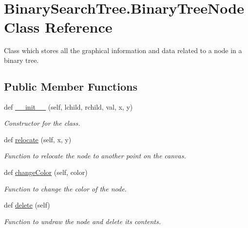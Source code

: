 \hypertarget{class_binary_search_tree_1_1_binary_tree_node}{}\section{Binary\+Search\+Tree.\+Binary\+Tree\+Node Class Reference}
\label{class_binary_search_tree_1_1_binary_tree_node}


Class which stores all the graphical information and data related to a node in a binary tree.  


\subsection*{Public Member Functions}
\begin{DoxyCompactItemize}
\item 
def \hyperlink{class_binary_search_tree_1_1_binary_tree_node_a82eeb27919e933cb0bbab2bb19a4674a}{\+\_\+\+\_\+init\+\_\+\+\_\+} (self, lchild, rchild, val, x, y)
\begin{DoxyCompactList}\small\item\em Constructor for the class. \end{DoxyCompactList}\item 
def \hyperlink{class_binary_search_tree_1_1_binary_tree_node_aa7b30f6a083e5eb57d4048c6a83bfff1}{relocate} (self, x, y)
\begin{DoxyCompactList}\small\item\em Function to relocate the node to another point on the canvas. \end{DoxyCompactList}\item 
def \hyperlink{class_binary_search_tree_1_1_binary_tree_node_ab9dc94fd42e8ef8e1d7f5d5e62bb613a}{change\+Color} (self, color)
\begin{DoxyCompactList}\small\item\em Function to change the color of the node. \end{DoxyCompactList}\item 
\mbox{\label{class_binary_search_tree_1_1_binary_tree_node_a4697a030e64bcc4abf33c3c1e10febbd}} 
def \hyperlink{class_binary_search_tree_1_1_binary_tree_node_a4697a030e64bcc4abf33c3c1e10febbd}{delete} (self)
\begin{DoxyCompactList}\small\item\em Function to undraw the node and delete its contents. \end{DoxyCompactList}\item 

\end{DoxyCompactItemize}
